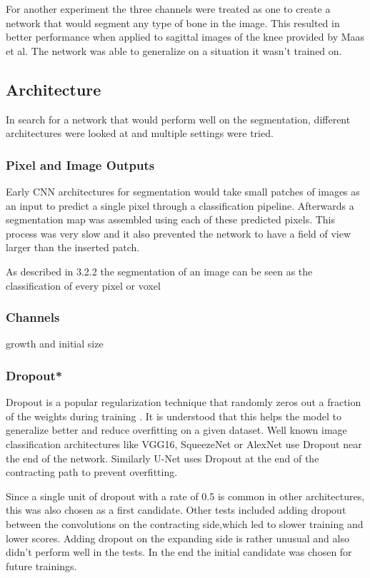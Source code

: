For another experiment the three channels were treated as one to create a network that would segment any type of bone in the image. This resulted in better performance when applied to sagittal images of the knee provided by Maas et al. The network was able to generalize on a situation it wasn't trained on.

\subsection{Architecture}

In search for a network that would perform well on the segmentation, different architectures were looked at and multiple settings were tried.

\subsubsection{Pixel and Image Outputs}

Early CNN architectures for segmentation would take small patches of images as an input to predict a single pixel through a classification pipeline. Afterwards a segmentation map was assembled using each of these predicted pixels. This process was very slow and it also prevented the network to have a field of view larger than the inserted patch.



As described in 3.2.2 the segmentation of an image can be seen as the classification of every pixel or voxel


\subsubsection{Channels}

growth and initial size

\subsubsection{Dropout*}

Dropout is a popular regularization technique that randomly zeros out a fraction of the weights during training \cite{Srivastava2014}. It is understood that this helps the model to generalize better and reduce overfitting on a given dataset. Well known image classification architectures like VGG16, SqueezeNet or AlexNet use Dropout near the end of the network. Similarly U-Net uses Dropout at the end of the contracting path to prevent overfitting.

Since a single unit of dropout with a rate of 0.5 is common in other architectures, this was also chosen as a first candidate. Other tests included adding dropout between the convolutions on the contracting side,which led to slower training and lower scores. Adding dropout on the expanding side is rather unusual and also didn't perform well in the tests. In the end the initial candidate was chosen for future trainings.

